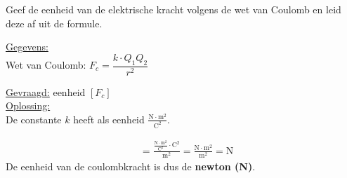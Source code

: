 \documentclass{ximera}
\begin{document}
\newpage
\begin{question}
    Geef de eenheid van de elektrische kracht volgens de wet van Coulomb en leid deze af uit de formule.

        \begin{solution}\nl
            \underline{Gegevens:}\\
            Wet van Coulomb: $F_{c}=\dfrac{k\cdot Q_{1}Q_{2}}{r^{2}}$

            \underline{Gevraagd:} eenheid $[F_{c}]$ \\

            \underline{Oplossing:}\\
            De constante $k$ heeft als eenheid $\mathrm{\frac{N\cdot m^2}{C^2}}$.  

            \begin{align*}
                [F_{c}] &= \frac{\mathrm{\frac{N\cdot m^2}{C^2}} \cdot \mathrm{C^2}}{\mathrm{m^2}} = \frac{\mathrm{N \cdot m^2}}{\mathrm{m^2}} = \mathrm{N}
            \end{align*}
            De eenheid van de coulombkracht is dus de \textbf{newton (N)}.\\
        \end{solution}
\end{question}
\end{document}
